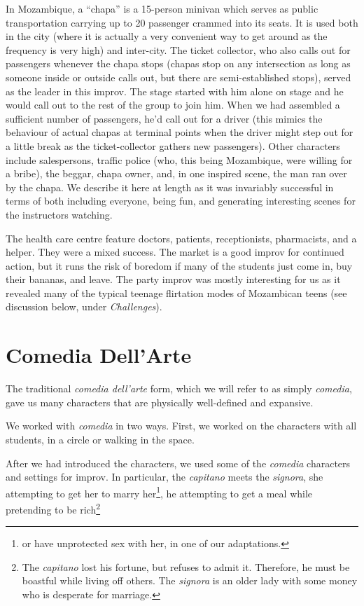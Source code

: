 \documentclass[article,twocolumn,twoside]{memoir}
\begin{document}
In Mozambique, a ``chapa'' is a 15-person minivan which serves as public
transportation carrying up to 20 passenger crammed into its seats. It is used
both in the city (where it is actually a very convenient way to get around as
the frequency is very high) and inter-city. The ticket collector, who also
calls out for passengers whenever the chapa stops (chapas stop on any
intersection as long as someone inside or outside calls out, but there are
semi-established stops), served as the leader in this improv. The stage started
with him alone on stage and he would call out to the rest of the group to join
him. When we had assembled a sufficient number of passengers, he'd call out for
a driver (this mimics the behaviour of actual chapas at terminal points when
the driver might step out for a little break as the ticket-collector gathers
new passengers). Other characters include salespersons, traffic police (who,
this being Mozambique, were willing for a bribe), the beggar, chapa owner, and,
in one inspired scene, the man ran over by the chapa. We describe it here at
length as it was invariably successful in terms of both including everyone,
being fun, and generating interesting scenes for the instructors watching.

The health care centre feature doctors, patients, receptionists, pharmacists,
and a helper. They were a mixed success. The market is a good improv for
continued action, but it runs the risk of boredom if many of the students just
come in, buy their bananas, and leave. The party improv was mostly interesting
for us as it revealed many of the typical teenage flirtation modes of
Mozambican teens (see discussion below, under \emph{Challenges}).

\section{Comedia Dell'Arte}

The traditional \textit{comedia dell'arte} form, which we will refer to as
simply \textit{comedia}, gave us many characters that are physically
well-defined and expansive.

We worked with \textit{comedia} in two ways. First, we worked on the characters
with all students, in a circle or walking in the space.

After we had introduced the characters, we used some of the \textit{comedia}
characters and settings for improv. In particular, the \textit{capitano} meets
the \textit{signora}, she attempting to get her to marry her\footnote{or have
unprotected sex with her, in one of our adaptations.}, he attempting to get a
meal while pretending to be rich\footnote{The \textit{capitano} lost his
fortune, but refuses to admit it. Therefore, he must be boastful while living
off others. The \textit{signora} is an older lady with some money who is
desperate for marriage.}
\end{document}
